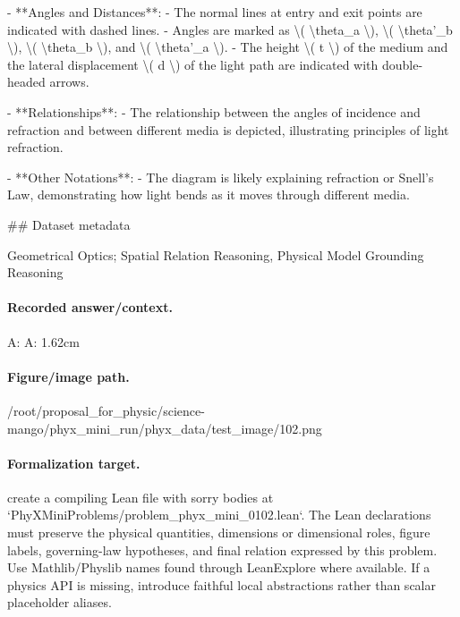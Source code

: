 - **Angles and Distances**:
  - The normal lines at entry and exit points are indicated with dashed lines.
  - Angles are marked as \textbackslash{}( \textbackslash{}theta\_a \textbackslash{}), \textbackslash{}( \textbackslash{}theta'\_b \textbackslash{}), \textbackslash{}( \textbackslash{}theta\_b \textbackslash{}), and \textbackslash{}( \textbackslash{}theta'\_a \textbackslash{}).
  - The height \textbackslash{}( t \textbackslash{}) of the medium and the lateral displacement \textbackslash{}( d \textbackslash{}) of the light path are indicated with double-headed arrows.

- **Relationships**:
  - The relationship between the angles of incidence and refraction and between different media is depicted, illustrating principles of light refraction.

- **Other Notations**:
  - The diagram is likely explaining refraction or Snell's Law, demonstrating how light bends as it moves through different media.

\#\# Dataset metadata

Geometrical Optics; Spatial Relation Reasoning, Physical Model Grounding Reasoning

\paragraph{Recorded answer/context.}
A: A: 1.62cm

\paragraph{Figure/image path.}
/root/proposal\_for\_physic/science-mango/phyx\_mini\_run/phyx\_data/test\_image/102.png

\paragraph{Formalization target.}
create a compiling Lean file with sorry bodies at `PhyXMiniProblems/problem\_phyx\_mini\_0102.lean`. The Lean declarations must preserve the physical quantities, dimensions or dimensional roles, figure labels, governing-law hypotheses, and final relation expressed by this problem.
Use Mathlib/Physlib names found through LeanExplore where available. If a physics API is missing, introduce faithful local abstractions rather than scalar placeholder aliases.

